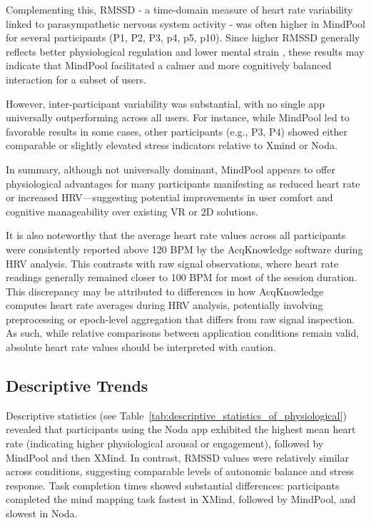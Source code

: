 \documentclass{CPP}
\begin{document}
Complementing this, RMSSD - a time-domain measure of heart rate variability linked to parasympathetic nervous system activity - was often higher in MindPool for several participants (P1, P2, P3, p4, p5, p10). Since higher RMSSD generally reflects better physiological regulation and lower mental strain \citep{Mehler2012,Fine2022}, these results may indicate that MindPool facilitated a calmer and more cognitively balanced interaction for a subset of users.

However, inter-participant variability was substantial, with no single app universally outperforming across all users. For instance, while MindPool led to favorable results in some cases, other participants (e.g., P3, P4) showed either comparable or slightly elevated stress indicators relative to Xmind or Noda.

In summary, although not universally dominant, MindPool appears to offer physiological advantages for many participants manifesting as reduced heart rate or increased HRV—suggesting potential improvements in user comfort and cognitive manageability over existing VR or 2D solutions.

It is also noteworthy that the average heart rate values across all participants were consistently reported above 120 BPM by the AcqKnowledge software during HRV analysis. This contrasts with raw signal observations, where heart rate readings generally remained closer to 100 BPM for most of the session duration. This discrepancy may be attributed to differences in how AcqKnowledge computes heart rate averages during HRV analysis, potentially involving preprocessing or epoch-level aggregation that differs from raw signal inspection. As such, while relative comparisons between application conditions remain valid, absolute heart rate values should be interpreted with caution.

\subsection{Descriptive Trends}

Descriptive statistics (see Table~\ref{tab:descriptive_statistics_of_physiological}) revealed that participants using the Noda app exhibited the highest mean heart rate (indicating higher physiological arousal or engagement), followed by MindPool and then XMind. In contrast, RMSSD values were relatively similar across conditions, suggesting comparable levels of autonomic balance and stress response. Task completion times showed substantial differences: participants completed the mind mapping task fastest in XMind, followed by MindPool, and slowest in Noda.
\end{document}
